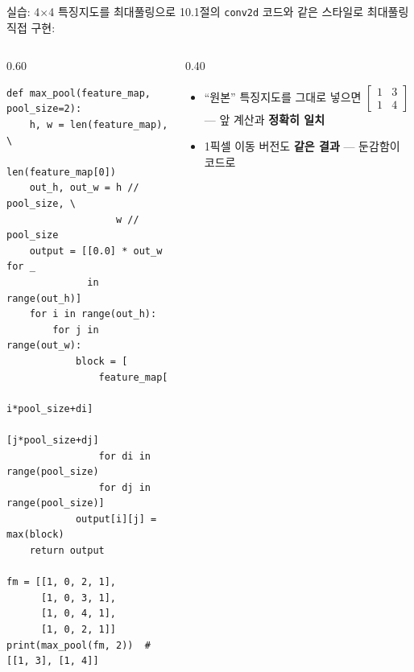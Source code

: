 \documentclass[aspectratio=169,11pt]{beamer}
\begin{document}
\begin{frame}[fragile]{실습: 4$\times$4 특징지도를 최대풀링으로}
  10.1절의 \texttt{conv2d} 코드와 같은 스타일로 최대풀링 직접 구현:
  \begin{columns}[T]
    \begin{column}{0.60\textwidth}
\begin{lstlisting}
def max_pool(feature_map, pool_size=2):
    h, w = len(feature_map), \
           len(feature_map[0])
    out_h, out_w = h // pool_size, \
                   w // pool_size
    output = [[0.0] * out_w for _
              in range(out_h)]
    for i in range(out_h):
        for j in range(out_w):
            block = [
                feature_map[
                    i*pool_size+di]
                    [j*pool_size+dj]
                for di in range(pool_size)
                for dj in range(pool_size)]
            output[i][j] = max(block)
    return output

fm = [[1, 0, 2, 1],
      [1, 0, 3, 1],
      [1, 0, 4, 1],
      [1, 0, 2, 1]]
print(max_pool(fm, 2))  # [[1, 3], [1, 4]]
\end{lstlisting}
    \end{column}
    \begin{column}{0.40\textwidth}
      \begin{itemize}
        \item ``원본'' 특징지도를 그대로 넣으면
          $\begin{bmatrix}1&3\\1&4\end{bmatrix}$ ---
          앞 계산과 \textbf{정확히 일치}
        \item 1픽셀 이동 버전도 \textbf{같은 결과}
          --- 둔감함이 코드로
      \end{itemize}
    \end{column}
  \end{columns}
\end{frame}
\end{document}
